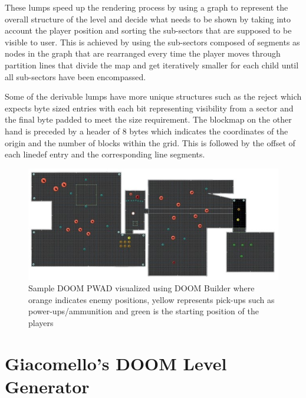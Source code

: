 \documentclass{Configuration_Files/PoliMi3i_thesis}
\begin{document}
These lumps speed up the rendering process by using a graph to represent the 
overall structure of the level and decide what needs to be shown by taking into 
account the player position and sorting the sub-sectors that are supposed to be 
visible to user. This is achieved by using the sub-sectors composed of segments as 
nodes in the graph that are rearranged every time the player moves through 
partition lines that divide the map and get iteratively smaller for each child until 
all sub-sectors have been encompassed.

Some of the derivable lumps have more unique structures such as the reject which 
expects byte sized entries with each bit representing visibility from a sector and the 
final byte padded to meet the size requirement. The blockmap on the other hand is 
preceded by a header of 8 bytes which indicates the coordinates of the origin and the 
number of blocks within the grid. This is followed by the offset of each linedef entry 
and the corresponding line segments.
\begin{figure}[H]
    \centering
    \includegraphics[width=1\textwidth]{sample_doom_builder.jpg}
    \caption[Sample DOOM PWAD visualized using DOOM Builder]{Sample DOOM PWAD visualized using DOOM Builder where orange 
indicates enemy positions, yellow represents pick-ups such as power-ups/ammunition and green is the starting position of the players}
    \label{fig:doombuilder}
\end{figure}
\newpage

\section{Giacomello’s DOOM Level Generator}
\end{document}
